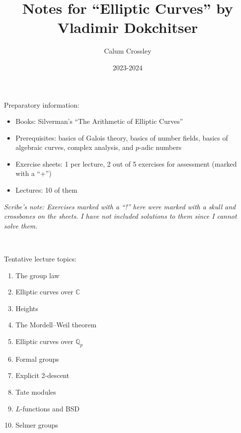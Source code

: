 \documentclass[a4paper]{article}
\title{Notes for ``Elliptic Curves'' by Vladimir Dokchitser}
\author{Calum Crossley}
\date{2023-2024}
\theoremstyle{plain}
\theoremstyle{remark}
\theoremstyle{definition}
\newcommand{\Q}{\mathbb{Q}}
\newcommand{\C}{\mathbb{C}}
\begin{document}
\maketitle

Preparatory information:
\begin{itemize}
    \item Books: Silverman's ``The Arithmetic of Elliptic Curves''
    \item Prerequisites: basics of Galois theory, basics of number fields,
        basics of algebraic curves, complex analysis, and $p$-adic numbers
    \item Exercise sheets: 1 per lecture, 2 out of 5 exercises for assessment
        (marked with a ``+'')
    \item Lectures: 10 of them
\end{itemize}

\textit{Scribe's note: Exercises marked with a ``!'' here were marked with a
    skull and crossbones on the sheets. I have not included solutions to them
    since I cannot solve them.}

~

Tentative lecture topics:
\begin{enumerate}[label=\arabic*)]
    \item The group law
    \item Elliptic curves over $\C$
    \item Heights
    \item The Mordell--Weil theorem
    \item Elliptic curves over $\Q_p$
    \item Formal groups
    \item Explicit 2-descent
    \item Tate modules
    \item $L$-functions and BSD
    \item Selmer groups
\end{enumerate}
\end{document}

